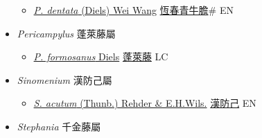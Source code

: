 \begin{itemize}
  \begin{itemize}
        \item[] \href{http://www.theplantlist.org/tpl1.1/search?q=Paratinospora+dentata}{\textit{P. dentata} (Diels) Wei Wang}     \href{\detokenize{http://taibnet.sinica.edu.tw/chi/taibnet_species_list.php?T2=恆春青牛膽&T2_new_value=true&fr=y}}{恆春青牛膽}\# EN
  \end{itemize}
 \item[] \textit{Pericampylus} 蓬萊藤屬
                    
  \begin{itemize}
        \item[] \href{http://www.theplantlist.org/tpl1.1/search?q=Pericampylus+formosanus}{\textit{P. formosanus} Diels}   \href{\detokenize{http://taibnet.sinica.edu.tw/chi/taibnet_species_list.php?T2=蓬萊藤&T2_new_value=true&fr=y}}{蓬萊藤} LC
  \end{itemize}
 \item[] \textit{Sinomenium} 漢防己屬
                    
  \begin{itemize}
        \item[] \href{http://www.theplantlist.org/tpl1.1/search?q=Sinomenium+acutum}{\textit{S. acutum} (Thunb.) Rehder \& E.H.Wils.}   \href{\detokenize{http://taibnet.sinica.edu.tw/chi/taibnet_species_list.php?T2=漢防己&T2_new_value=true&fr=y}}{漢防己} EN
  \end{itemize}
 \item[] \textit{Stephania} 千金藤屬
                    

\end{itemize}
